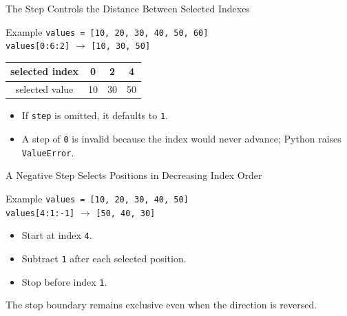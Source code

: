 \documentclass[aspectratio=169,10pt]{beamer}
\begin{document}

\begin{frame}{The Step Controls the Distance Between Selected Indexes}
  \begin{block}{Example}
    \texttt{values = [10, 20, 30, 40, 50, 60]}\\[0.10in]
    \texttt{values[0:6:2]} $\longrightarrow$ \texttt{[10, 30, 50]}
  \end{block}

  \begin{center}
    \renewcommand{\arraystretch}{1.2}
    \begin{tabular}{c|c|c|c}
      selected index & 0 & 2 & 4 \\\hline
      selected value & 10 & 30 & 50
    \end{tabular}
  \end{center}

  \begin{itemize}
    \item If \texttt{step} is omitted, it defaults to \texttt{1}.
    \item A step of \texttt{0} is invalid because the index would never advance; Python raises \texttt{ValueError}.
  \end{itemize}
\end{frame}





\begin{frame}{A Negative Step Selects Positions in Decreasing Index Order}
  \begin{block}{Example}
    \texttt{values = [10, 20, 30, 40, 50]}\\[0.10in]
    \texttt{values[4:1:-1]} $\longrightarrow$ \texttt{[50, 40, 30]}
  \end{block}

  \begin{itemize}
    \item Start at index \texttt{4}.
    \item Subtract \texttt{1} after each selected position.
    \item Stop before index \texttt{1}.
  \end{itemize}

  \begin{keyidea}
    The stop boundary remains exclusive even when the direction is reversed.
  \end{keyidea}
\end{frame}
\end{document}
